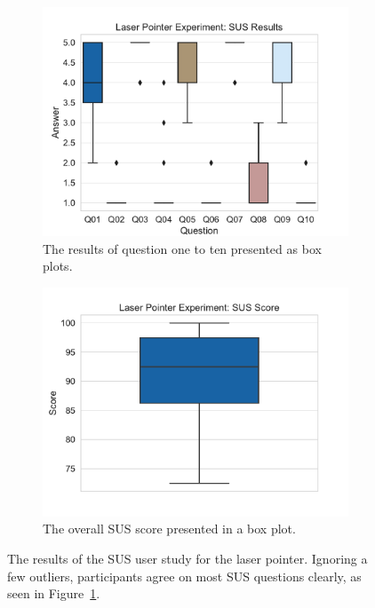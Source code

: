 \begin{figure}[H]
	\centering
	\begin{subfigure}{.48\linewidth}%
		\centering
		\includegraphics[width=\linewidth]{figures/evaluation/res_exp_lp.pdf}
    \caption{The results of question one to ten presented as box plots.}\label{fig:res-exp-lp}
	\end{subfigure}%
	\hspace{0.04\linewidth}%
	\begin{subfigure}{.48\linewidth}%
		\centering
		\includegraphics[width=\linewidth]{figures/evaluation/score_exp_lp.pdf}
		\caption{The overall \gls{SUS} score presented in a box plot.}\label{fig:score-exp-lp}
	\end{subfigure}%
	\caption[Laser pointer SUS results]{The results of the \gls{SUS} user study for the laser pointer. Ignoring a few outliers, participants agree on most \gls{SUS} questions clearly, as seen in Figure~\ref{fig:res-exp-lp}.}\label{fig:exp-lp-stats}
\end{figure}

